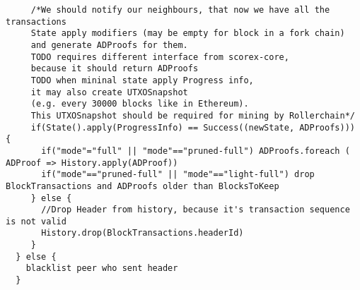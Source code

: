 \documentclass[]{report}   %
\begin{document}
\begin{enumerate}
\begin{verbatim}
     /*We should notify our neighbours, that now we have all the transactions
     State apply modifiers (may be empty for block in a fork chain)
     and generate ADProofs for them.
     TODO requires different interface from scorex-core,
     because it should return ADProofs
     TODO when mininal state apply Progress info,
     it may also create UTXOSnapshot
     (e.g. every 30000 blocks like in Ethereum).
     This UTXOSnapshot should be required for mining by Rollerchain*/
     if(State().apply(ProgressInfo) == Success((newState, ADProofs))) {
       if("mode"="full" || "mode"=="pruned-full") ADProofs.foreach ( ADProof => History.apply(ADProof))
       if("mode"=="pruned-full" || "mode"=="light-full") drop BlockTransactions and ADProofs older than BlocksToKeep
     } else {
       //Drop Header from history, because it's transaction sequence is not valid
       History.drop(BlockTransactions.headerId)
     }
  } else {
    blacklist peer who sent header
  }
   \end{verbatim}
\end{enumerate}
\end{document}
